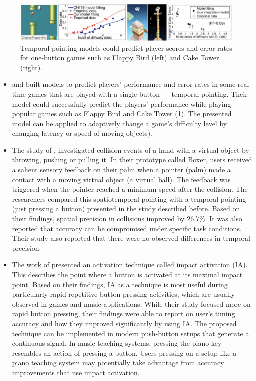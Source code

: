 \documentclass[manuscript,screen]{acmart}
\begin{document}
\begin{figure}[t]
\centering
 \includegraphics[width=12cm]{figures/flappybird.png}
    \caption{Temporal pointing models could predict player scores and error rates for one-button games such as Flappy Bird (left) and Cake Tower (right).
    }\label{fig:flappybird}
\end{figure}

\begin{itemize}
\item \citet{lee2016modelling} and \citet{lee2018moving} built models to predict players’ performance and error rates in some real-time games that are played with a single button — temporal pointing. Their model could successfully predict the players’ performance while playing popular games such as Flappy Bird and Cake Tower (\ref{fig:flappybird}). The presented model can be applied to adaptively change a game’s difficulty level by changing latency or speed of moving objects). 
\item The study of \citet{lee2017boxer}, investigated collision events of a hand with a virtual object by throwing, pushing or pulling it. In their prototype called Boxer, users received a salient sensory feedback on their palm when a pointer (palm) made a contact with a moving virtual object (a virtual ball). The feedback was triggered when the pointer reached a minimum speed after the collision. The researchers compared this spatiotemporal pointing with a temporal pointing (just pressing a button) presented in the study described before. Based on their findings, spatial precision in collisions improved by 26.7\%. It was also reported that accuracy can be compromised under specific task conditions. Their study also reported that there were no observed differences in temporal precision.
\item The work of \citet{kim2018impact} presented an activation technique called impact activation (IA). This describes the point where a button is activated at its maximal impact point. Based on their findings, IA as a technique is most useful during particularly-rapid repetitive button pressing activities, which are usually observed in games and music applications. While their study focused more on rapid button pressing, their findings were able to report on user’s timing accuracy and how they improved significantly by using IA. The proposed technique can be implemented in modern push-button setups that generate a continuous signal. In music teaching systems, pressing the piano key resembles an action of pressing a button. Users pressing on a setup like a piano teaching system may potentially take advantage from accuracy improvements that use impact activation. 
\end{itemize}
\end{document}
